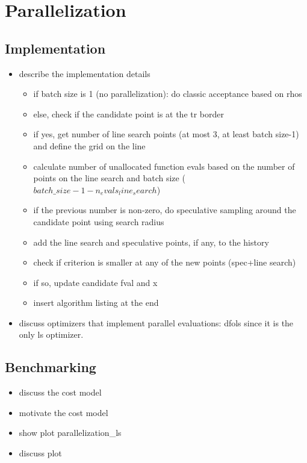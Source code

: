 

\section{Parallelization}
\subsection{Implementation}
\label{subsec:algo-impl-parallel}
\begin{itemize}
\item describe the implementation details
\begin{itemize}
    \item if batch size is 1 (no parallelization): do classic acceptance based on rhos
    \item else, check if the candidate point is at the tr border
    \item if yes, get number of line search points (at most 3, at least batch size-1) and define the grid on the line
    \item calculate number of unallocated function evals based on the number of points on the line search and batch size ($batch\_size-1-n_evals_line_search$) 
    \item if the previous number is non-zero, do speculative sampling around the candidate point using search radius
    \item add the line search and speculative points, if any, to the history
    \item check if criterion is smaller at any of the new points (spec+line search)
    \item if so, update candidate fval and x
    \item insert algorithm listing at the end
\end{itemize}
\item discuss optimizers that implement parallel evaluations: dfols since it is the only ls optimizer.
\end{itemize}

\subsection{Benchmarking}
\label{subsec:benchmark-parallel}
\begin{itemize}
    \item discuss the cost model
    \item motivate the cost model
    \item show plot parallelization\_ls
    \item discuss plot
\end{itemize}
